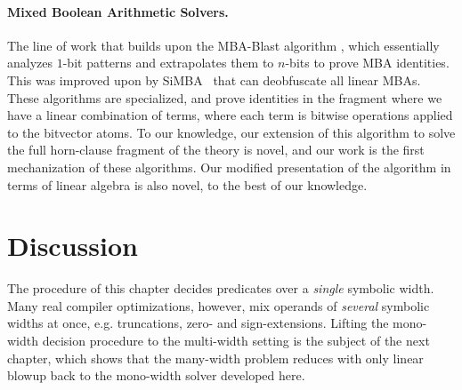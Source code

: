 \paragraph{Mixed Boolean Arithmetic Solvers.}
The line of work that builds upon the MBA-Blast algorithm \cite{liu2021mba},
which essentially analyzes $1$-bit patterns and extrapolates them to $n$-bits to prove MBA identities.
This was improved upon by SiMBA~\cite{reichenwallner2022efficient} that can deobfuscate all linear MBAs.
These algorithms are specialized, and prove identities in the fragment where we have a linear combination of terms,
where each term is bitwise operations applied to the bitvector atoms.
To our knowledge, our extension of this algorithm to solve the full horn-clause fragment of the theory is novel,
and our work is the first mechanization of these algorithms.
Our modified presentation of the algorithm in terms of linear algebra is also novel, to the best of our knowledge.

\section{Discussion}
\label{sec:mono:limitations}

The procedure of this chapter decides predicates over a \emph{single} symbolic
width. Many real compiler optimizations, however, mix operands of \emph{several}
symbolic widths at once, e.g. truncations, zero- and sign-extensions. 
Lifting the mono-width decision procedure to the multi-width setting is the subject of the next chapter,
which shows that the many-width problem reduces with only linear blowup back to the mono-width solver developed here.
